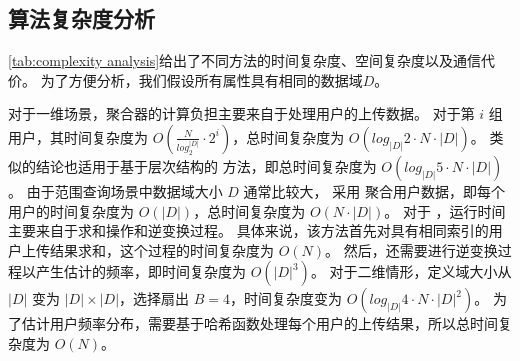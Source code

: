\subsection{算法复杂度分析}
\label{Complexity Analysis}
\begin{table}[h]
    \centering
    \caption{文中所涉及方法的复杂度比较，表格列出了聚合器计算、存储空间和聚合器-用户通信复杂度。}
    \label{tab:complexity analysis}
    \end{table}

\autoref{tab:complexity analysis}给出了不同方法的时间复杂度、空间复杂度以及通信代价。
为了方便分析，我们假设所有属性具有相同的数据域$D$。

对于一维场景，聚合器的计算负担主要来自于处理用户的上传数据。
对于第 $i$ 组用户，其时间复杂度为 $O(\frac{N}{log_2^{|D|}}\cdot2^i)$，总时间复杂度为 $O(log_{|D|}2\cdot N \cdot|D|)$。
类似的结论也适用于基于层次结构的 \myhio 方法，即总时间复杂度为 $O(log_{|D|}5\cdot N \cdot|D|)$。
由于范围查询场景中数据域大小 $D$ 通常比较大，
\mycalm 采用 \oue 聚合用户数据，即每个用户的时间复杂度为 $O(|D|)$，总时间复杂度为 $O(N \cdot |D|)$。
对于 \mydht，运行时间主要来自于求和操作和逆变换过程。
具体来说，该方法首先对具有相同索引的用户上传结果求和，这个过程的时间复杂度为 $O(N)$。
然后，\mydht 还需要进行逆变换过程以产生估计的频率，即时间复杂度为 $O(|D|^3)$。
对于二维情形，定义域大小从 $|D|$ 变为 $|D| \times |D|$，\myahead 选择扇出 $B=4$，时间复杂度变为 $O(log_{|D|}4\cdot N \cdot|D|^2)$。
为了估计用户频率分布，\myHDG 需要基于哈希函数处理每个用户的上传结果，所以总时间复杂度为 $O(N)$。

